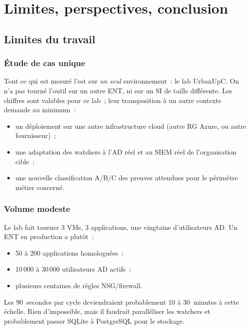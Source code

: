 \chapter{Limites, perspectives, conclusion}
\label{ch:limites}

\section{Limites du travail}

\subsection{Étude de cas unique}

Tout ce qui est mesuré l'est sur \emph{un seul} environnement~:
le lab UrbanUpC. On n'a pas tourné l'outil sur un autre ENT, ni
sur un SI de taille différente. Les chiffres sont valables pour
ce lab~; leur transposition à un autre contexte demande au
minimum~:

\begin{itemize}
  \item un déploiement sur une autre infrastructure cloud
    (autre RG Azure, ou autre fournisseur)~;
  \item une adaptation des watchers à l'AD réel et au SIEM
    réel de l'organisation cible~;
  \item une nouvelle classification A/B/C des preuves attendues
    pour le périmètre métier concerné.
\end{itemize}

\subsection{Volume modeste}

Le lab fait tourner 3 VMs, 3 applications, une vingtaine
d'utilisateurs AD. Un ENT en production a plutôt~:

\begin{itemize}
  \item 50 à 200 applications homologuées~;
  \item 10\,000 à 30\,000 utilisateurs AD actifs~;
  \item plusieurs centaines de règles NSG/firewall.
\end{itemize}

Les 90~secondes par cycle deviendraient probablement 10 à
30~minutes à cette échelle. Rien d'impossible, mais il faudrait
paralléliser les watchers et probablement passer SQLite à
PostgreSQL pour le stockage.

